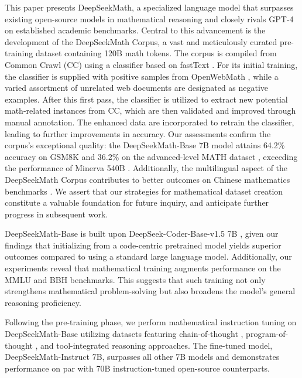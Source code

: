 This paper presents DeepSeekMath, a specialized language model that surpasses existing open-source models in mathematical reasoning and closely rivals GPT-4 on established academic benchmarks. Central to this advancement is the development of the DeepSeekMath Corpus, a vast and meticulously curated pre-training dataset containing 120B math tokens. The corpus is compiled from Common Crawl (CC) using a classifier based on fastText \citep{joulin2016fasttext}. For its initial training, the classifier is supplied with positive samples from OpenWebMath \citep{openwebmath}, while a varied assortment of unrelated web documents are designated as negative examples. After this first pass, the classifier is utilized to extract new potential math-related instances from CC, which are then validated and improved through manual annotation. The enhanced data are incorporated to retrain the classifier, leading to further improvements in accuracy. Our assessments confirm the corpus’s exceptional quality: the DeepSeekMath-Base 7B model attains 64.2\% accuracy on GSM8K \citep{gsm8k} and 36.2\% on the advanced-level MATH dataset \citep{MATH}, exceeding the performance of Minerva 540B \citep{minerva}. Additionally, the multilingual aspect of the DeepSeekMath Corpus contributes to better outcomes on Chinese mathematics benchmarks \citep{wei2023cmath,agieval}. We assert that our strategies for mathematical dataset creation constitute a valuable foundation for future inquiry, and anticipate further progress in subsequent work.

DeepSeekMath-Base is built upon DeepSeek-Coder-Base-v1.5 7B \citep{deepseek-coder}, given our findings that initializing from a code-centric pretrained model yields superior outcomes compared to using a standard large language model. Additionally, our experiments reveal that mathematical training augments performance on the MMLU \citep{mmlu} and BBH \citep{bbh} benchmarks. This suggests that such training not only strengthens mathematical problem-solving but also broadens the model’s general reasoning proficiency.

Following the pre-training phase, we perform mathematical instruction tuning on DeepSeekMath-Base utilizing datasets featuring chain-of-thought \citep{cot}, program-of-thought \citep{pot,pal}, and tool-integrated reasoning \citep{tora} approaches. The fine-tuned model, DeepSeekMath-Instruct 7B, surpasses all other 7B models and demonstrates performance on par with 70B instruction-tuned open-source counterparts.

